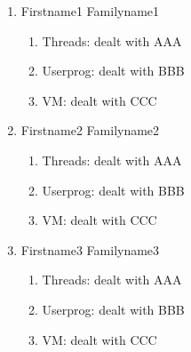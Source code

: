 \documentclass[a4paper,12pt]{report}
\begin{document}
\begin{enumerate}
	\item Firstname1 Familyname1 
	    \begin{enumerate}
	     \item Threads: dealt with AAA
	     \item Userprog: dealt with BBB
	     \item VM: dealt with CCC
	    \end{enumerate}

	\item Firstname2 Familyname2
	    \begin{enumerate}
	     \item Threads: dealt with AAA
	     \item Userprog: dealt with BBB
	     \item VM: dealt with CCC
	    \end{enumerate}
	    
	\item Firstname3 Familyname3
	    \begin{enumerate}
	     \item Threads: dealt with AAA
	     \item Userprog: dealt with BBB
	     \item VM: dealt with CCC
	    \end{enumerate}

	   
\end{enumerate}












\end{document}
